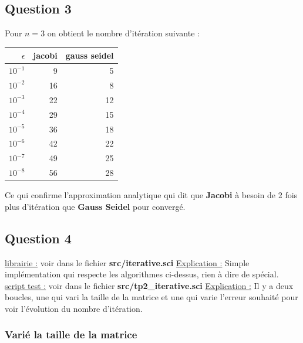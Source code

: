 \documentclass[11pt]{article}
\begin{document}
\subsection{Question 3}

Pour $n = 3$ on obtient le nombre d'itération suivante :

\begin{center}
  \begin{tabular}{|r|r|r|}
    \hline
    $\epsilon$ & jacobi & gauss seidel \\ \hline
    $10^{-1}$ & 9 & 5 \\ \hline
    $10^{-2}$ & 16 & 8 \\ \hline
    $10^{-3}$ & 22 & 12 \\ \hline
    $10^{-4}$ & 29 & 15 \\ \hline
    $10^{-5}$ & 36 & 18 \\ \hline
    $10^{-6}$ & 42 & 22 \\ \hline
    $10^{-7}$ & 49 & 25 \\ \hline
    $10^{-8}$ & 56 & 28 \\ \hline
  \end{tabular}
\end{center}

Ce qui confirme l'approximation analytique qui dit que \textbf{Jacobi}
à besoin de 2 fois plus d'itération que \textbf{Gauss Seidel} pour
convergé.

\subsection{Question 4}

\underline{librairie :} voir dans le fichier
\textbf{src/iterative.sci}\newline
\underline{Explication :}\newline
Simple implémentation qui respecte les algorithmes ci-dessus, rien à
dire de spécial.\newline
\vspace{5mm}
\underline{script test :} voir dans le fichier
\textbf{src/tp2\_iterative.sci}\newline
\underline{Explication :}\newline
Il y a deux boucles, une qui vari la taille de la matrice et une qui
varie l'erreur souhaité pour voir l'évolution du nombre d'itération.

\subsubsection{Varié la taille de la matrice}
\end{document}
